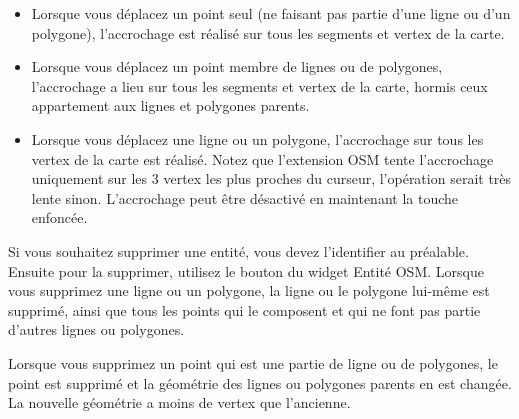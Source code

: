 \begin{itemize}
\item Lorsque vous déplacez un point seul (ne faisant pas partie d'une ligne ou d'un polygone), l'accrochage est réalisé sur tous les segments et vertex de la carte.
\item Lorsque vous déplacez un point membre de lignes ou de polygones, l'accrochage a lieu sur tous les segments et vertex de la carte, hormis ceux appartement aux lignes et polygones parents.
\item Lorsque vous déplacez une ligne ou un polygone, l'accrochage sur tous les vertex de la carte est réalisé. Notez que l'extension OSM tente l'accrochage uniquement sur les 3 vertex les plus proches du curseur, l'opération serait très lente sinon. L'accrochage peut être désactivé en maintenant la touche  enfoncée.
\end{itemize}


Si vous souhaitez supprimer une entité, vous devez l'identifier au préalable. Ensuite pour la supprimer, utilisez le bouton  du widget Entité OSM. Lorsque vous supprimez une ligne ou un polygone, la ligne ou le polygone lui-même est supprimé, ainsi que tous les points qui le composent et qui ne font pas partie d'autres lignes ou polygones.

Lorsque vous supprimez un point qui est une partie de ligne ou de polygones, le point est supprimé et la géométrie des lignes ou polygones parents en est changée. La nouvelle géométrie a moins de vertex que l'ancienne.

